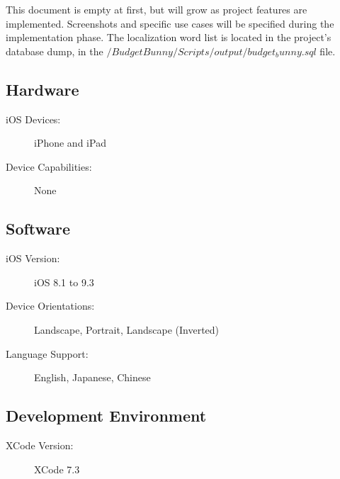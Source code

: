 
This document is empty at first, but will grow as project features are implemented.  
Screenshots and specific use cases will be specified during the implementation phase.
The localization word list is located in the project's database dump, in the $/BudgetBunny/Scripts/output/budget_bunny.sql$ file. 

\subsection{Hardware}
\begin{description}
\item[iOS Devices:] iPhone and iPad
\item[Device Capabilities:] None
\end{description}

\subsection{Software}
\begin{description}
\item[iOS Version:] iOS 8.1 to 9.3
\item[Device Orientations:] Landscape, Portrait, Landscape (Inverted)
\item[Language Support:] English, Japanese, Chinese
\end{description}

\subsection{Development Environment}
\begin{description}
\item[XCode Version:] XCode 7.3
\end{description}


